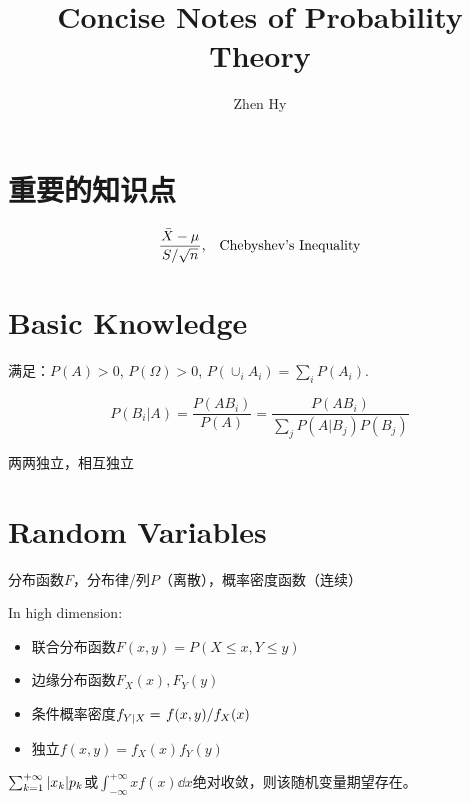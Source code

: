 \documentclass{article}
\begin{document}
\title{Concise Notes of Probability Theory}
\author{Zhen Hy}
\maketitle
\section{重要的知识点}
\[
	\frac{\bar{X}-\mu}{\flatfrac{S}{\sqrt{n}}}
	\qq*{,}
	\mbox{Chebyshev's Inequality}
\] 

\section{Basic Knowledge}

\begin{defi}[概率, $P$]
	满足：$P(A)>0$, $P(\Omega)>0$, $P(\cup_iA_i)=\sum_iP(A_i)$.
\end{defi}

\begin{thm}[Bayes]
	\[
		P(B_i|A)=\frac{P(AB_i)}{P(A)}
		=
		\frac{P(AB_i)}{\sum_jP(A|B_j)P(B_j)}
	\] 
\end{thm}

\begin{defi}
	两两独立，相互独立
\end{defi}

\section{Random Variables}
\begin{defi}
    分布函数$F$，分布律/列$P$（离散），概率密度函数（连续）
\end{defi}

\begin{defi}
	In high dimension:
	\begin{itemize}
		\item 联合分布函数$F(x,y)=P(X\le x,Y\le y)$
		\item 边缘分布函数$F_X(x),F_Y(y)$
		\item 条件概率密度$f_{Y|X}=\flatfrac{f(x,y)}{f_X(x)}$
		\item 独立$f(x,y)=f_X(x)f_Y(y)$
	\end{itemize}
\end{defi}

\begin{defi}[Expectation期望]
	$\sum_{k=1}^{+\infty}\abs{x_k}p_k$或$\int_{-\infty}^{+\infty}xf(x)\dd x$绝对收敛，则该随机变量期望存在。
\end{defi}
\end{document}
